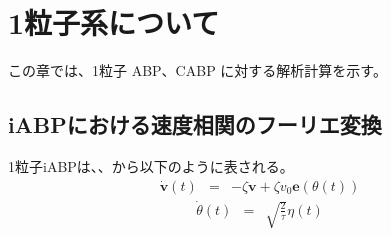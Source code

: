 \documentclass[../thesis]{subfiles}
\begin{document}
\renewcommand{\prechaptername}{付録}
\renewcommand{\postchaptername}{}
\renewcommand{\thechapter}{\Alph{chapter}}
\setcounter{chapter}{0}

\chapter{1粒子系について}
この章では、1粒子 ABP、CABP に対する解析計算を示す。
\section{iABPにおける速度相関のフーリエ変換}
1粒子iABPは、、から以下のように表される。
\begin{eqnarray}\label{eq:eom_iabp_1}
    \dot{\bm{v}}(t)&=& - \zeta \bm{v}  +\zeta v_0 \bm{e}(\theta(t))
\end{eqnarray}
\begin{eqnarray}\label{eq:eomabp_2}
    \dot{\theta }(t) &=& \sqrt{\frac{2}{\tau}}\eta(t)
\end{eqnarray}
\end{document}
